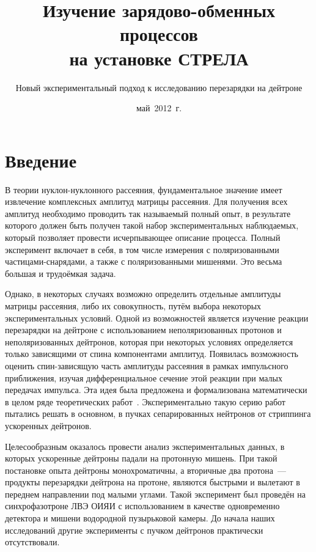 \title{Изучение зарядово-обменных процессов \\ на установке СТРЕЛА}
\author{Новый экспериментальный подход к исследованию перезарядки на дейтроне}
\date{май~2012~г.}
\maketitle

\section{Введение}
В теории нуклон-нуклонного рассеяния, фундаментальное значение имеет извлечение
комплексных амплитуд матрицы рассеяния. Для получения всех амплитуд необходимо
проводить так называемый полный опыт, в результате которого должен быть получен
такой набор экспериментальных наблюдаемых, который позволяет провести
исчерпывающее описание процесса. Полный эксперимент включает в себя, в том числе
измерения с поляризованными частицами-снарядами, а также с поляризованными
мишенями. Это весьма большая и трудоёмкая задача.

Однако, в некоторых случаях возможно определить отдельные амплитуды матрицы
рассеяния, либо их совокупность, путём выбора некоторых экспериментальных
условий. Одной из возможностей является изучение реакции перезарядки на
дейтроне \dpchex с использованием неполяризованных протонов и неполяризованных
дейтронов, которая при некоторых условиях определяется только зависящими от
спина компонентами амплитуд. Появилась возможность оценить спин-зависящую часть
амплитуды \np рассеяния в рамках импульсного приближения, изучая
дифференциальное сечение этой реакции при малых передачах импульса. Эта идея
была предложена и формализована математически в целом ряде теоретических
работ~\cite{pom51,chew50,dean72_2}. Экспериментально такую серию работ пытались
решать в основном, в пучках сепарированных нейтронов от стриппинга ускоренных
дейтронов.

Целесообразным оказалось провести анализ экспериментальных данных, в которых
ускоренные дейтроны падали на протонную мишень. При такой постановке опыта
дейтроны монохроматичны, а вторичные два протона~--- продукты перезарядки
дейтрона на протоне, являются быстрыми и вылетают в переднем направлении под
малыми углами. Такой эксперимент был проведён на синхрофазотроне ЛВЭ ОИЯИ с
использованием в качестве одновременно детектора и мишени водородной пузырьковой
камеры. До начала наших исследований другие эксперименты с пучком дейтронов
практически отсутствовали.

